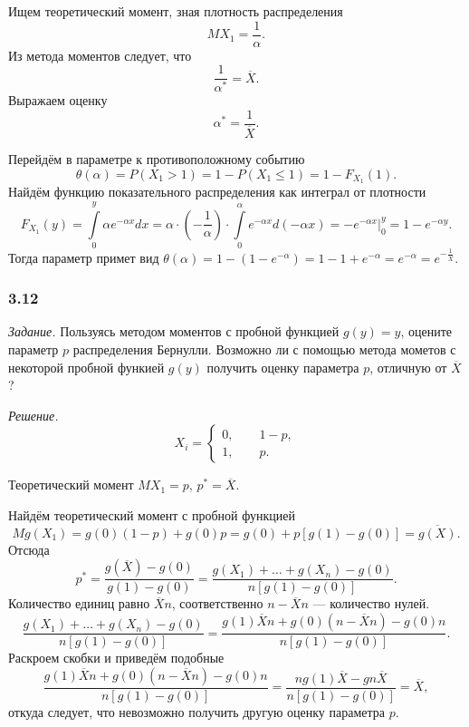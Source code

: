 Ищем теоретический момент, зная плотность распределения
$$MX_1 =
  \frac{1}{ \alpha }.$$
Из метода моментов следует, что
$$ \frac{1}{ \alpha^*} =
  \overline{X}.$$
Выражаем оценку
$$ \alpha^* =
  \frac{1}{ \overline{X}}.$$

Перейдём в параметре к противоположному событию
$$ \theta \left( \alpha \right) =
  P \left( X_1 > 1 \right) =
  1 - P \left( X_1 \leq 1 \right) =
  1 - F_{X_1} \left( 1 \right).$$
Найдём функцию показательного распределения как интеграл от плотности
$$F_{X_1} \left( y \right) =
  \int \limits_0^y \alpha e^{ - \alpha x} dx =
  \alpha \cdot \left( - \frac{1}{ \alpha } \right) \cdot
  \int \limits_0^{ \alpha } e^{- \alpha x} d \left( - \alpha x \right) =
  \left. -e^{- \alpha x} \right|_0^y =
  1 - e^{- \alpha y}.$$
Тогда параметр примет вид
$ \theta \left( \alpha \right) =
  1 - \left( 1 - e^{- \alpha } \right) =
  1 - 1 + e^{- \alpha } =
  e^{- \alpha } =
  e^{- \frac{1}{ \overline{X}}}.$

\subsubsection*{3.12}

\textit{Задание.}
Пользуясь методом моментов с пробной функцией $g \left( y \right) = y$,
оцените параметр $p$ распределения Бернулли.
Возможно ли с помощью метода мометов с некоторой
пробной функией $g \left( y \right) $ получить оценку параметра $p$, отличную от $ \overline{X}$?

\textit{Решение.}
$$X_i =
  \begin{cases}
    0, \qquad 1 - p, \\
    1, \qquad p.
  \end{cases}$$

Теоретический момент $MX_1 = p, \, p^* = \overline{X}$.

Найдём теоретический момент с пробной функцией
$$Mg \left( X_1 \right) =
  g \left( 0 \right) \left( 1 - p \right) + g \left( 0 \right) p =
  g \left( 0 \right) + p \left[ g \left( 1 \right) - g \left( 0 \right) \right] =
  \overline{g \left( X \right) }.$$
Отсюда
$$p^* =
  \frac{g \left( \overline{X} \right) - g \left( 0 \right) }{g \left( 1 \right) - g \left( 0 \right) }=
  \frac{g \left( X_1 \right) + \dotsc + g \left( X_n \right) - g \left( 0 \right) }{n \left[ g \left( 1 \right) - g \left( 0 \right) \right]}.$$
Количество единиц равно $ \overline{X} n$, соответственно $n - \overline{X} n$ --- количество нулей.
$$\frac{g \left( X_1 \right) + \dotsc + g \left( X_n \right) - g \left( 0 \right) }{n \left[ g \left( 1 \right) - g \left( 0 \right) \right]} =
  \frac{g \left( 1 \right) \overline{X} n + g \left( 0 \right) \left( n - \overline{X} n \right) - g \left( 0 \right) n}{n \left[ g \left( 1 \right) - g \left( 0 \right) \right] }.$$
Раскроем скобки и приведём подобные
$$ \frac{g \left( 1 \right) \overline{X} n + g \left( 0 \right) \left( n - \overline{X} n \right) - g \left( 0 \right) n}{n \left[ g \left( 1 \right) - g \left( 0 \right) \right] } =
  \frac{ng \left( 1 \right) \overline{X} - gn \overline{X}}{n \left[ g \left( 1 \right) - g \left( 0 \right) \right] } =
  \overline{X},$$
откуда следует, что невозможно получить другую оценку параметра $p$.

